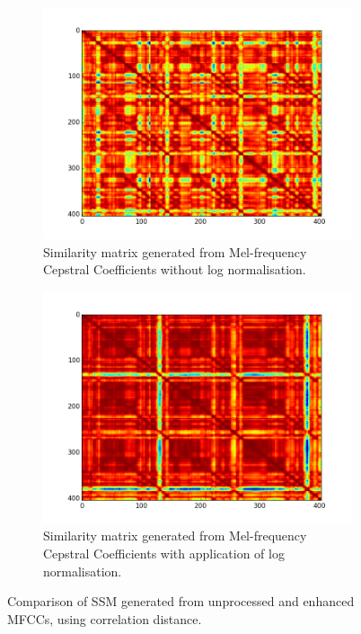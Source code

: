\begin{figure}[h]
        \centering
        \begin{subfigure}[b]{0.47\textwidth}
                \includegraphics[width=\textwidth]{Figures/mfcc_no_log_sync}
                \caption{Similarity matrix generated from Mel-frequency Cepstral Coefficients without log normalisation.}
                \label{fig:unMFCC}
        \end{subfigure}%
        \begin{subfigure}[b]{0.47\textwidth}
                \includegraphics[width=\textwidth]{Figures/mfcc_ssm_synched}
                \caption{Similarity matrix generated from Mel-frequency Cepstral Coefficients with application of log normalisation.}
                \label{fig:synMFCC}
        \end{subfigure}
          \caption{Comparison of SSM generated from unprocessed and enhanced MFCCs, using correlation distance.}
        \label{fig:MFCCcomparison}
\end{figure}

